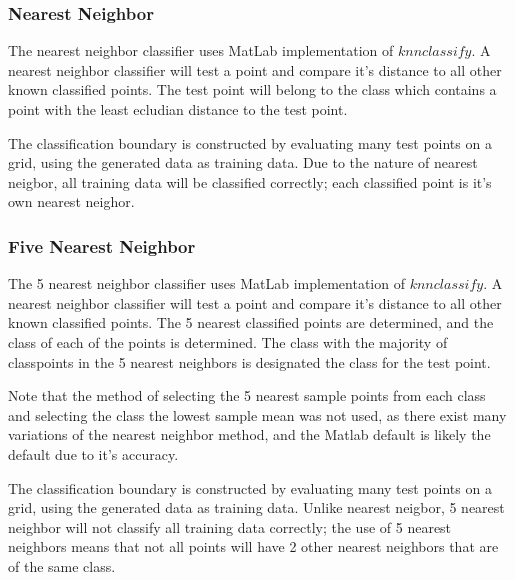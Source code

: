 \subsubsection{Nearest Neighbor}

The nearest neighbor classifier uses MatLab implementation of $knnclassify$. A nearest neighbor classifier will test a point and compare it's distance to all other known classified points. The test point will belong to the class which contains a point with the least ecludian distance to the test point.

The classification boundary is constructed by evaluating many test points on a grid, using the generated data as training data. Due to the nature of nearest neigbor, all training data will be classified correctly; each classified point is it's own nearest neighor.

\subsubsection{Five Nearest Neighbor}

The 5 nearest neighbor classifier uses MatLab implementation of $knnclassify$. A nearest neighbor classifier will test a point and compare it's distance to all other known classified points. The 5 nearest classified points are determined, and the class of each of the points is determined. The class with the majority of classpoints in the 5 nearest neighbors is designated the class for the test point.

Note that the method of selecting the 5 nearest sample points from each class and selecting the class the lowest sample mean was not used, as there exist many variations of the nearest neighbor method, and the Matlab default is likely the default due to it's accuracy.

The classification boundary is constructed by evaluating many test points on a grid, using the generated data as training data. Unlike nearest neigbor, 5 nearest neighbor will not classify all training data correctly; the use of 5 nearest neighbors means that not all points will have 2 other nearest neighbors that are of the same class.

